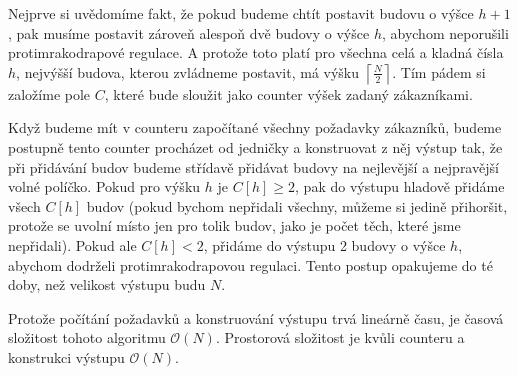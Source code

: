 \documentclass{fkssolpub}
\author{Ondřej Sedláček}
\begin{document}
Nejprve si uvědomíme fakt, že pokud budeme chtít postavit budovu o výšce $h + 1$, pak musíme postavit zároveň alespoň dvě budovy o výšce $h$, abychom neporušili protimrakodrapové regulace. A protože toto platí pro všechna celá a kladná čísla $h$, nejvýšší budova, kterou zvládneme postavit, má výšku $\left\lceil \frac{N}{2} \right\rceil$. Tím pádem si založíme pole $C$, které bude sloužit jako counter výšek zadaný zákazníkami.

Když budeme mít v counteru započítané všechny požadavky zákazníků, budeme postupně tento counter procházet od jedničky a konstruovat z něj výstup tak, že při přidávání budov budeme střídavě přidávat budovy na nejlevější a nejpravější volné políčko. Pokud pro výšku $h$ je $C[h] \geq 2$, pak do výstupu hladově přidáme všech $C[h]$ budov (pokud bychom nepřidali všechny, můžeme si jedině přihoršit, protože se uvolní místo jen pro tolik budov, jako je počet těch, které jsme nepřidali). Pokud ale $C[h] < 2$, přidáme do výstupu 2 budovy o výšce $h$, abychom dodrželi protimrakodrapovou regulaci. Tento postup opakujeme do té doby, než velikost výstupu budu $N$.

Protože počítání požadavků a konstruování výstupu trvá lineárně času, je časová složitost tohoto algoritmu $\mathcal{O}(N)$. Prostorová složitost je kvůli counteru a konstrukci výstupu $\mathcal{O}(N)$.
\end{document}
